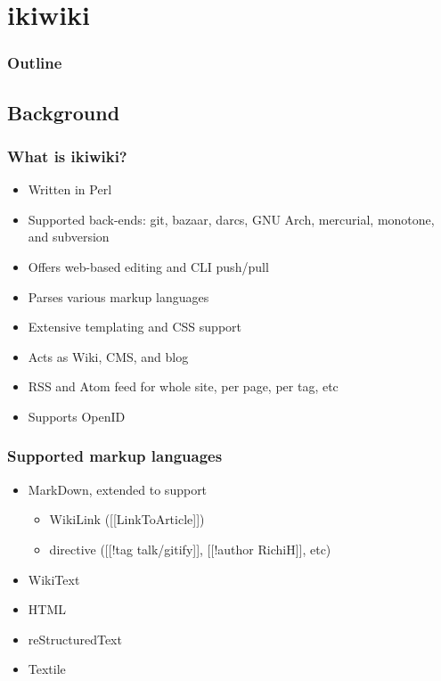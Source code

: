 \documentclass[t]{beamer}
\begin{document}
\section{ikiwiki}

\begin{frame}
	\frametitle{Outline}
	\tableofcontents[currentsection]
\end{frame}

\subsection{Background}

\begin{frame}
	\frametitle{What is ikiwiki?}
	\begin{itemize}
		\item Written in Perl
		\item Supported back-ends: git, bazaar, darcs, GNU Arch, mercurial, monotone, and subversion
		\item Offers web-based editing and CLI push/pull
		\item Parses various markup languages
		\item Extensive templating and CSS support
		\item Acts as Wiki, CMS, and blog
		\item RSS and Atom feed for whole site, per page, per tag, etc
		\item Supports OpenID
	\end{itemize}
\end{frame}

\begin{frame}
	\frametitle{Supported markup languages}
	\begin{itemize}
		\item MarkDown, extended to support
		\begin{itemize}
			\item WikiLink ([[LinkToArticle]])
			\item directive ([[!tag talk/gitify]], [[!author RichiH]], etc)
		\end{itemize}
		\item WikiText
		\item HTML
		\item reStructuredText
		\item Textile
	\end{itemize}
\end{frame}
\end{document}
